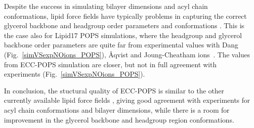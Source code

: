 \documentclass[journal=jpcbfk,manuscript=article]{achemso}
\begin{document}
Despite the success in simulating bilayer dimensions and acyl chain conformations,
lipid force fields have typically problems in capturing the correct glycerol backbone and
headgroup order parameters and conformations \cite{botan15,ollila16,NMRlipidsIV}.
This is the case also for Lipid17 POPS simulations, where the headgroup and glycerol backbone
order parameters are quite far from experimental values with Dang (Fig.~\ref{simVSexpNOions_POPS}),
{\AA}qvist and Joung-Cheatham ions~\cite{NMRlipidsIV}. The values from ECC-POPS simulation are closer,
but not in full agreement with experiments (Fig.~\ref{simVSexpNOions_POPS}).


%

In conclusion, the stuctural quality of ECC-POPS is similar to the other currently available
lipid force fields \cite{botan15, catte16, Pluhackova2016, nmrlipids_proj4},
giving good agreement with experiments for acyl chain conformations and bilayer dimensions,
while there is a room for improvement in the glycerol backbone and headgroup region
conformations.
 
\end{document}
